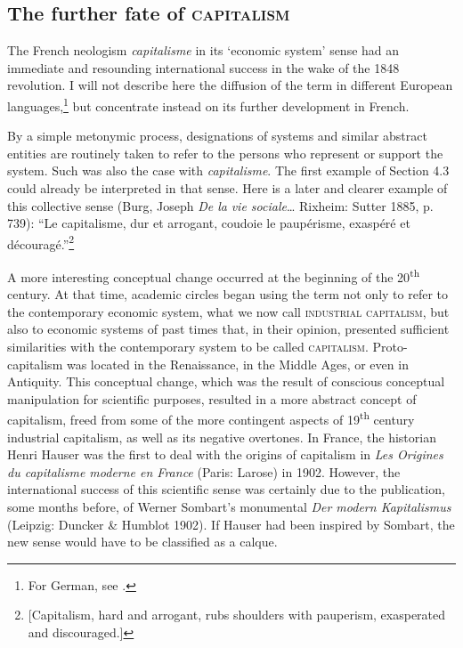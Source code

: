 \documentclass[output=paper]{langsci/langscibook}
\begin{document}
\subsection{The further fate of \textsc{capitalism}}
\largerpage
The French neologism \emph{capitalisme} in its `economic system' sense
had an immediate and resounding international success in the wake of the
1848 revolution. I will not describe here the diffusion of the
term in different European languages,\footnote{For German, see %
\citet{Hilger82}%
%
.} but concentrate instead on its further development in French.

By a simple metonymic process, designations of systems and similar
abstract entities are routinely taken to refer to the persons who
represent or support the system. Such was also the case with
\emph{capitalisme}. The first example of Section 4.3 could already be
interpreted in that sense. Here is a later and clearer example of this
collective sense (Burg, Joseph \emph{De la} \emph{vie sociale}\ldots{}
Rixheim: Sutter 1885, p. 739): ``Le capitalisme, dur et arrogant,
coudoie le paupérisme, exaspéré et découragé.''\footnote{{[}Capitalism,
  hard and arrogant, rubs shoulders with pauperism, exasperated and
  discouraged.{]}}

A more interesting conceptual change occurred at the beginning of the
20\textsuperscript{th} century. At that time, academic circles began
using the term not only to refer to the contemporary economic system,
what we now call \textsc{industrial capitalism}, but also to economic
systems of past times that, in their opinion, presented sufficient
similarities with the contemporary system to be called
\textsc{capitalism}. Proto-capitalism was located in the Renaissance, in
the Middle Ages, or even in Antiquity. This conceptual change, which was
the result of conscious conceptual manipulation for scientific purposes,
resulted in a more abstract concept of capitalism, freed from some of
the more contingent aspects of 19\textsuperscript{th} century industrial
capitalism, as well as its negative overtones. In France, the historian
Henri Hauser was the first to deal with the origins of capitalism in
\emph{Les Origines du capitalisme moderne en France} (Paris: Larose) in
1902. However, the international success of this scientific sense was
certainly due to the publication, some months before, of Werner
Sombart's monumental \emph{Der modern Kapitalismus} (Leipzig: Duncker \&
Humblot 1902). If Hauser had been inspired by Sombart, the new sense
would have to be classified as a calque.
\end{document}
